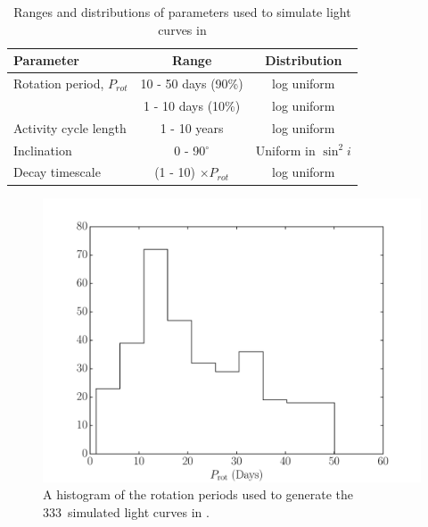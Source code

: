 \documentclass[useAMS, usenatbib, preprint, 12pt]{aastex}
\newcommand{\naigrain}{333}
\begin{document}
\begin{table}
\begin{center}
\caption{Ranges and distributions of parameters used to simulate light curves
in \citet{Aigrain2015}}
\begin{tabular}{lcc}
\hline\hline
    Parameter & Range & Distribution \\
    \hline
    Rotation period, $P_{rot}$ & 10 - 50 days (90\%) & log uniform \\
    & 1 - 10 days (10\%) & log uniform \\
    Activity cycle length & 1 - 10 years & log uniform \\
    Inclination & 0 - 90$^\circ$ & Uniform in $\sin^2i$ \\
    Decay timescale & (1 - 10) $\times P_{rot}$ & log uniform \\
\hline
\end{tabular}
\end{center}
\end{table}
\label{tab:simulation_parameters}

\begin{figure}
\begin{center}
\includegraphics[width=6in, clip=true]{figures/period_hist.pdf}
\caption{A histogram of the rotation periods used to generate the \naigrain\
simulated light curves in \citet{Aigrain2015}.}
\label{fig:period_hist}
\end{center}
\end{figure}
\end{document}
